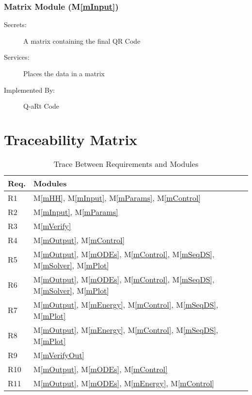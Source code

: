 \documentclass[12pt, titlepage]{article}
\newcommand{\mref}[1]{M\ref{#1}}
\begin{document}
\subsubsection{Matrix Module (\mref{mInput})}

\begin{description}
\item[Secrets:] A matrix containing the final QR Code
\item[Services:] Places the data in a matrix
\item[Implemented By:] Q-aRt Code
\end{description}

\section{Traceability Matrix} \label{SecTM}


\begin{table}[H]
\centering
\begin{tabular}{p{} p{}}
\toprule
\textbf{Req.} & \textbf{Modules}\\
\midrule
R1 & \mref{mHH}, \mref{mInput}, \mref{mParams}, \mref{mControl}\\
R2 & \mref{mInput}, \mref{mParams}\\
R3 & \mref{mVerify}\\
R4 & \mref{mOutput}, \mref{mControl}\\
R5 & \mref{mOutput}, \mref{mODEs}, \mref{mControl}, \mref{mSeqDS}, \mref{mSolver}, \mref{mPlot}\\
R6 & \mref{mOutput}, \mref{mODEs}, \mref{mControl}, \mref{mSeqDS}, \mref{mSolver}, \mref{mPlot}\\
R7 & \mref{mOutput}, \mref{mEnergy}, \mref{mControl}, \mref{mSeqDS}, \mref{mPlot}\\
R8 & \mref{mOutput}, \mref{mEnergy}, \mref{mControl}, \mref{mSeqDS}, \mref{mPlot}\\
R9 & \mref{mVerifyOut}\\
R10 & \mref{mOutput}, \mref{mODEs}, \mref{mControl}\\
R11 & \mref{mOutput}, \mref{mODEs}, \mref{mEnergy}, \mref{mControl}\\
\bottomrule
\end{tabular}
\caption{Trace Between Requirements and Modules}
\label{TblRT}
\end{table}
\end{document}

